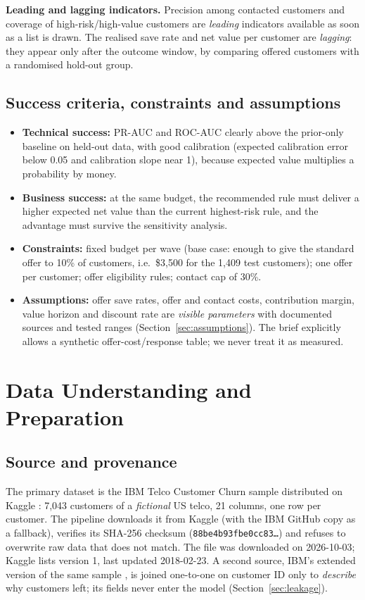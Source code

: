 \documentclass[11pt,a4paper]{article}
\begin{document}
\textbf{Leading and lagging indicators.} Precision among contacted customers and coverage of high-risk/high-value customers are \emph{leading} indicators available as soon as a list is drawn. The realised save rate and net value per customer are \emph{lagging}: they appear only after the outcome window, by comparing offered customers with a randomised hold-out group.

\subsection{Success criteria, constraints and assumptions}

\begin{itemize}
  \item \textbf{Technical success:} PR-AUC and ROC-AUC clearly above the prior-only baseline on held-out data, with good calibration (expected calibration error below 0.05 and calibration slope near 1), because expected value multiplies a probability by money.
  \item \textbf{Business success:} at the same budget, the recommended rule must deliver a higher expected net value than the current highest-risk rule, and the advantage must survive the sensitivity analysis.
  \item \textbf{Constraints:} fixed budget per wave (base case: enough to give the standard offer to 10\% of customers, i.e.\ \$3,500 for the 1,409 test customers); one offer per customer; offer eligibility rules; contact cap of 30\%.
  \item \textbf{Assumptions:} offer save rates, offer and contact costs, contribution margin, value horizon and discount rate are \emph{visible parameters} with documented sources and tested ranges (Section~\ref{sec:assumptions}). The brief explicitly allows a synthetic offer-cost/response table; we never treat it as measured.
\end{itemize}

\section{Data Understanding and Preparation}

\subsection{Source and provenance}

The primary dataset is the IBM Telco Customer Churn sample distributed on Kaggle \cite{kaggle2018}: 7,043 customers of a \emph{fictional} US telco, 21 columns, one row per customer. The pipeline downloads it from Kaggle (with the IBM GitHub copy as a fallback), verifies its SHA-256 checksum (\texttt{88be4b93fbe0cc83\ldots}) and refuses to overwrite raw data that does not match. The file was downloaded on 2026-10-03; Kaggle lists version 1, last updated 2018-02-23. A second source, IBM's extended version of the same sample \cite{kaggle2020ibm}, is joined one-to-one on customer ID only to \emph{describe} why customers left; its fields never enter the model (Section~\ref{sec:leakage}).
\end{document}
